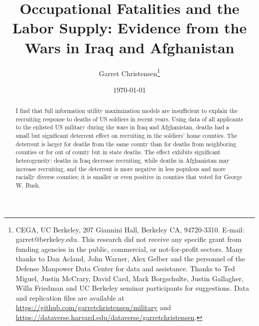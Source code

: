 \documentclass[12pt] {article}
\begin{document}
\title{Occupational Fatalities and the Labor Supply: Evidence from the Wars in Iraq and
Afghanistan}
\date{\today}
\author{Garret Christensen\thanks{
CEGA, UC Berkeley, 207 Giannini Hall, Berkeley CA, 94720-3310. E-mail: garret@berkeley.edu. This research did not receive any specific grant from funding agencies in the public, commercial, or
not-for-profit sectors. Many thanks to Dan Acland, John Warner, Alex Gelber and the personnel
of the Defense Manpower Data Center for data and assistance. Thanks
to Ted Miguel, Justin McCrary, David Card, Mark Borgschulte, Justin
Gallagher, Willa Friedman and UC Berkeley seminar participants for
suggestions. Data and replication files are available at \url{https://github.com/garretchristensen/military} and \url{https://dataverse.harvard.edu/dataverse/garretchristensen}.}}
\maketitle



\begin{abstract}

I find that full information utility maximization models are insufficient to explain the recruiting response to deaths of US soldiers in recent years. Using data of all applicants to the enlisted US military during the wars in Iraq and Afghanistan, deaths had a small but significant deterrent effect on recruiting in the soldiers' home counties. The deterrent is larger for deaths from the same county than for deaths from neighboring counties or for out of county but in state deaths. %
The effect exhibits significant heterogeneity: deaths in Iraq decrease recruiting, while deaths in Afghanistan may increase recruiting, and the deterrent is more negative in less populous and more racially diverse counties; it is smaller or even positive in counties that voted for George W. Bush.

\end{abstract}
\end{document}
